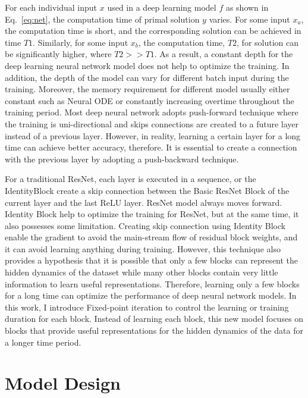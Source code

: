 \documentclass{article}
\begin{document}
For each individual input $x$ used in a deep learning model $f$ as shown in Eq.~\eqref{eq:net}, the computation time of primal solution $y$ varies. For some input $x_a$, the computation time is short, and the corresponding solution can be achieved in time $T1$. Similarly, for some input  $x_b$, the computation time, $T2$, for solution can be significantly higher, where $T2 >> T1$. As a result, a constant depth for the deep learning neural network model does not help to optimize the training. In addition, the depth of the model can vary for different batch input during the training. Moreover, the memory requirement for different model usually either constant such as Neural ODE \cite{chen2018neural} or constantly increasing overtime throughout the training period. Most deep neural network adopts push-forward technique where the training is uni-directional and skips connections are created to a future layer instead of a previous layer. However, in reality, learning a certain layer for a long time can achieve better accuracy, therefore. It is essential to create a connection with the previous layer by adopting a push-backward technique.  

For a traditional ResNet, each layer is executed in a sequence, or the IdentityBlock create a skip connection between the Basic ResNet Block of the current layer and the last ReLU layer. ResNet model always moves forward.  Identity Block help to optimize the training for ResNet, but at the same time, it also possesses some limitation. Creating skip connection using Identity Block enable the gradient to avoid the main-stream flow of residual block weights, and it can avoid learning anything during training. However, this technique also provides a hypothesis that it is possible that only a few blocks can represent the hidden dynamics of the dataset while many other blocks contain very little information to learn useful representations. Therefore, learning only a few blocks for a long time can optimize the performance of deep neural network models. In this work, I introduce Fixed-point iteration \cite{pearlmutteralgorithmic} to control the learning or training duration for each block. Instead of learning each block, this new model focuses on blocks that provide useful representations for the hidden dynamics of the data for a longer time period. 



\section{Model Design}
\end{document}
